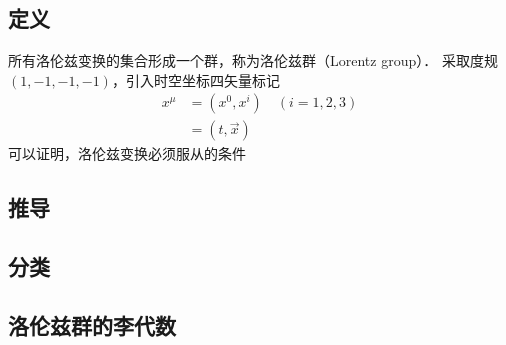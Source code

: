 \subsection{定义}
所有洛伦兹变换的集合形成一个群，称为洛伦兹群（Lorentz group）．
采取度规$(1,-1,-1,-1)$，引入时空坐标四矢量标记
$$\begin{aligned}
x^{\mu} &=\left(x^{0}, x^{i}\right) \quad(i=1,2,3) \\
&=(t, \vec{x})
\end{aligned}$$
可以证明，洛伦兹变换必须服从的条件

\subsection{推导}

\subsection{分类}



\subsection{洛伦兹群的李代数}
